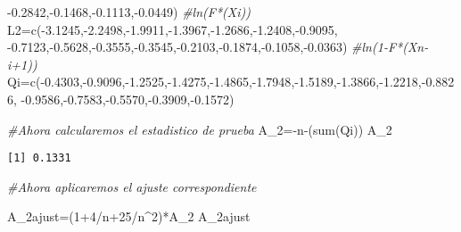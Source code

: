 \documentclass[
  a4paper,
  oneside,
  openany]{book}
\newenvironment{Shaded}{\begin{snugshade}}{\end{snugshade}}
\newcommand{\CommentTok}[1]{\textcolor[rgb]{0.56,0.35,0.01}{\textit{#1}}}
\newcommand{\DecValTok}[1]{\textcolor[rgb]{0.00,0.00,0.81}{#1}}
\newcommand{\FloatTok}[1]{\textcolor[rgb]{0.00,0.00,0.81}{#1}}
\newcommand{\FunctionTok}[1]{\textcolor[rgb]{0.00,0.00,0.00}{#1}}
\newcommand{\NormalTok}[1]{#1}
\newcommand{\OtherTok}[1]{\textcolor[rgb]{0.56,0.35,0.01}{#1}}
\newcommand{\SpecialCharTok}[1]{\textcolor[rgb]{0.00,0.00,0.00}{#1}}
\begin{document}
\begin{Shaded}
\begin{Highlighting}[]
      \SpecialCharTok{{-}}\FloatTok{0.2842}\NormalTok{,}\SpecialCharTok{{-}}\FloatTok{0.1468}\NormalTok{,}\SpecialCharTok{{-}}\FloatTok{0.1113}\NormalTok{,}\SpecialCharTok{{-}}\FloatTok{0.0449}\NormalTok{)    }\CommentTok{\#ln(F*(Xi))}
\NormalTok{L2}\OtherTok{=}\FunctionTok{c}\NormalTok{(}\SpecialCharTok{{-}}\FloatTok{3.1245}\NormalTok{,}\SpecialCharTok{{-}}\FloatTok{2.2498}\NormalTok{,}\SpecialCharTok{{-}}\FloatTok{1.9911}\NormalTok{,}\SpecialCharTok{{-}}\FloatTok{1.3967}\NormalTok{,}\SpecialCharTok{{-}}\FloatTok{1.2686}\NormalTok{,}\SpecialCharTok{{-}}\FloatTok{1.2408}\NormalTok{,}\SpecialCharTok{{-}}\FloatTok{0.9095}\NormalTok{,}
\SpecialCharTok{{-}}\FloatTok{0.7123}\NormalTok{,}\SpecialCharTok{{-}}\FloatTok{0.5628}\NormalTok{,}\SpecialCharTok{{-}}\FloatTok{0.3555}\NormalTok{,}\SpecialCharTok{{-}}\FloatTok{0.3545}\NormalTok{,}\SpecialCharTok{{-}}\FloatTok{0.2103}\NormalTok{,}\SpecialCharTok{{-}}\FloatTok{0.1874}\NormalTok{,}\SpecialCharTok{{-}}\FloatTok{0.1058}\NormalTok{,}\SpecialCharTok{{-}}\FloatTok{0.0363}\NormalTok{)  }\CommentTok{\#ln(1{-}F*(Xn{-}i+1))}
\NormalTok{Qi}\OtherTok{=}\FunctionTok{c}\NormalTok{(}\SpecialCharTok{{-}}\FloatTok{0.4303}\NormalTok{,}\SpecialCharTok{{-}}\FloatTok{0.9096}\NormalTok{,}\SpecialCharTok{{-}}\FloatTok{1.2525}\NormalTok{,}\SpecialCharTok{{-}}\FloatTok{1.4275}\NormalTok{,}\SpecialCharTok{{-}}\FloatTok{1.4865}\NormalTok{,}\SpecialCharTok{{-}}\FloatTok{1.7948}\NormalTok{,}\SpecialCharTok{{-}}\FloatTok{1.5189}\NormalTok{,}\SpecialCharTok{{-}}\FloatTok{1.3866}\NormalTok{,}\SpecialCharTok{{-}}\FloatTok{1.2218}\NormalTok{,}\SpecialCharTok{{-}}\FloatTok{0.8826}\NormalTok{,}
\SpecialCharTok{{-}}\FloatTok{0.9586}\NormalTok{,}\SpecialCharTok{{-}}\FloatTok{0.7583}\NormalTok{,}\SpecialCharTok{{-}}\FloatTok{0.5570}\NormalTok{,}\SpecialCharTok{{-}}\FloatTok{0.3909}\NormalTok{,}\SpecialCharTok{{-}}\FloatTok{0.1572}\NormalTok{)}

\CommentTok{\#Ahora calcularemos el estadistico de prueba}
\NormalTok{A\_2}\OtherTok{=}\SpecialCharTok{{-}}\NormalTok{n}\SpecialCharTok{{-}}\NormalTok{(}\FunctionTok{sum}\NormalTok{(Qi))}
\NormalTok{A\_2}
\end{Highlighting}
\end{Shaded}

\begin{verbatim}
[1] 0.1331
\end{verbatim}

\begin{Shaded}
\begin{Highlighting}[]
\CommentTok{\#Ahora aplicaremos el ajuste correspondiente}

\NormalTok{A\_2ajust}\OtherTok{=}\NormalTok{(}\DecValTok{1}\SpecialCharTok{+}\DecValTok{4}\SpecialCharTok{/}\NormalTok{n}\SpecialCharTok{+}\DecValTok{25}\SpecialCharTok{/}\NormalTok{n}\SpecialCharTok{\^{}}\DecValTok{2}\NormalTok{)}\SpecialCharTok{*}\NormalTok{A\_2}
\NormalTok{A\_2ajust}
\end{Highlighting}
\end{Shaded}
\end{document}
